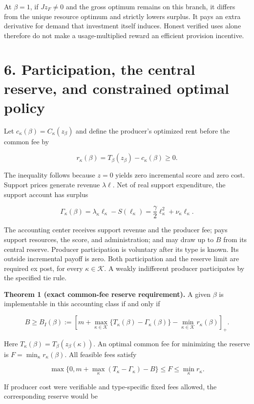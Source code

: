 \documentclass[
  11pt,
]{article}
\begin{document}
At \(\beta=1\), if \(Jz_F\ne0\) and the gross optimum remains on this
branch, it differs from the unique resource optimum and strictly lowers
surplus. It pays an extra derivative for demand that investment itself
induces. Honest verified uses alone therefore do not make a
usage-multiplied reward an efficient provision incentive.

\section{6. Participation, the central reserve, and constrained optimal
policy}\label{participation-the-central-reserve-and-constrained-optimal-policy}

Let \(c_\kappa(\beta)=C_\kappa(z_\beta)\) and define the producer's
optimized rent before the common fee by

\[r_\kappa(\beta)=T_\beta(z_\beta)-c_\kappa(\beta)\geq0. \tag{21}\]

The inequality follows because \(z=0\) yields zero incremental score and
zero cost. Support prices generate revenue \(\lambda\ell\). Net of real
support expenditure, the support account has surplus

\[\Gamma_\kappa(\beta)=\lambda_\kappa\ell_\kappa-S(\ell_\kappa)
=\frac\gamma2\ell_\kappa^2+\nu_\kappa\ell_\kappa. \tag{22}\]

The accounting center receives support revenue and the producer fee;
pays support resources, the score, and administration; and may draw up
to \(B\) from its central reserve. Producer participation is voluntary
after its type is known. Its outside incremental payoff is zero. Both
participation and the reserve limit are required ex post, for every
\(\kappa\in\mathcal K\). A weakly indifferent producer participates by
the specified tie rule.

\textbf{Theorem 1 (exact common-fee reserve requirement).} A given
\(\beta\) is implementable in this accounting class if and only if

\[B\geq B_I(\beta):=
\left[m+\max_{\kappa\in\mathcal K}
\{T_\kappa(\beta)-\Gamma_\kappa(\beta)\}
-\min_{\kappa\in\mathcal K}r_\kappa(\beta)\right]_+. \tag{23}\]

Here \(T_\kappa(\beta)=T_\beta(z_\beta(\kappa))\). An optimal common fee
for minimizing the reserve is \(F=\min_\kappa r_\kappa(\beta)\). All
feasible fees satisfy

\[\max\{0,m+\max_\kappa(T_\kappa-\Gamma_\kappa)-B\}
\leq F\leq\min_\kappa r_\kappa. \tag{24}\]

If producer cost were verifiable and type-specific fixed fees allowed,
the corresponding reserve would be
\end{document}
